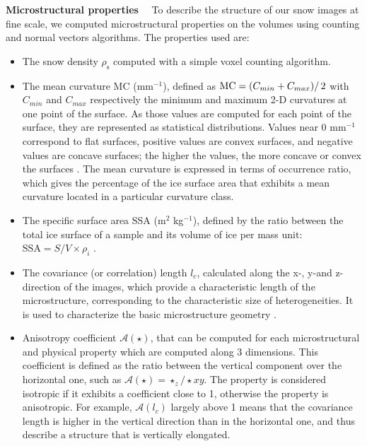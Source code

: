 \documentclass[draft,ms]{agujournal2019}
\begin{document}
\noindent \textbf{Microstructural properties}$\quad$ To describe the structure of our snow images at fine scale, we computed microstructural properties on the volumes using counting and normal vectors algorithms. The properties used are:
\begin{itemize}
    \item The snow density $\rho_{\mathrm{s}}$ computed with a simple voxel counting algorithm.
    
    \item The mean curvature MC (mm$^{-1}$), defined as $\mathrm{MC} = \left(C_{min} + C_{max})\right/2$ with $C_{min}$ and $C_{max}$ respectively the minimum and maximum 2-D curvatures at one point of the surface. As those values are computed for each point of the surface, they are represented as statistical distributions. Values near 0 mm$^{-1}$ correspond to flat surfaces, positive values are convex surfaces, and negative values are concave surfaces; the higher the values, the more concave or convex the surfaces \cite{flin_three-dimensional_2004, brzoska2007using, wang2012curvature}. The mean curvature is expressed in terms of occurrence ratio, which gives the percentage of the ice surface area that exhibits a mean curvature located in a particular curvature class.
    
    \item The specific surface area SSA (m$^2$ kg$^{-1}$), defined by the ratio between the total ice surface of a sample and its volume of ice per mass unit: $\mathrm{SSA}=S/V \times \rho_{i}$ \cite{flin2011computations, berryman1998planar}.
    
    \item  The covariance (or correlation) length $l_{c}$, calculated along the x-, y-and z- direction of the images, which provide a characteristic length of the microstructure, corresponding to the characteristic size of heterogeneities. It is used to characterize the basic microstructure geometry \cite{lowe2013general}. 
    
    \item Anisotropy coefficient
    $\mathcal{A}(\star)$, that can be computed for each microstructural and physical property which are computed along 3 dimensions. This coefficient is defined as the ratio between the vertical component over the horizontal one, such as $\mathcal{A}(\star)=\star_{z} / \star x y$. The property is considered isotropic if it exhibits a coefficient close to 1, otherwise the property is anisotropic. For example, $\mathcal{A}(l_c)$ largely above 1 means that the covariance length is higher in the vertical direction than in the horizontal one, and thus describe a structure that is vertically elongated.
\end{itemize}
\end{document}
